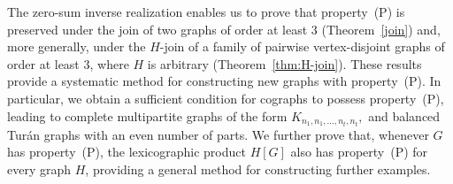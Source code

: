 \documentclass[12pt,reqno]{amsart}
\theoremstyle{definition}
\numberwithin{equation}{subsection}
\numberwithin{equation}{section}
\newcommand{\thmref}[1]{Theorem~\ref{#1}}
\begin{document}
The zero-sum inverse realization enables us to prove that property~(P) is preserved under the join of two graphs of order at least \(3\) (\thmref{join}) and, more generally, under the \(H\)-join of a family of pairwise vertex-disjoint graphs of order at least \(3\), where \(H\) is arbitrary (\thmref{thm:H-join}).
These results provide a systematic method for constructing new graphs with property~(P).
 In particular, we obtain a sufficient condition for cographs to possess property~(P), leading to complete multipartite graphs of the form
\(
K_{n_1,n_1,\ldots,n_t,n_t},
\)
and balanced Tur\'an graphs with an even number of parts. We further prove that, whenever \(G\) has property~(P), the lexicographic product \(H[G]\) also has property~(P) for every graph \(H\), providing a general method for constructing further examples.

\end{document}
